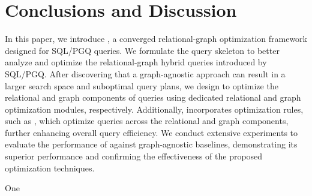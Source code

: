 
\section{Conclusions and Discussion}
\label{sec:conclusions}

In this paper, we introduce \name, a converged relational-graph optimization framework designed for SQL/PGQ queries. We formulate the \spjm query skeleton to better analyze and optimize the relational-graph hybrid queries introduced by SQL/PGQ. After discovering that a graph-agnostic approach can result in a larger search space and suboptimal query plans, we design \name to optimize the relational and graph components of \spjm queries using dedicated relational and graph optimization modules, respectively. Additionally, \name incorporates optimization rules, such as \filterrule, which optimize queries across the relational and graph components, further enhancing overall query efficiency. We conduct extensive experiments to evaluate the performance of \name against graph-agnostic baselines, demonstrating its superior performance and confirming the effectiveness of the proposed optimization techniques.



One 





\balance
